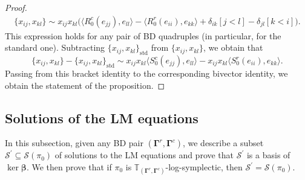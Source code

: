 \documentclass[11pt]{article}
\newcommand{\bbeta}{\boldsymbol{\beta}}
\newcommand{\bg}{\mathbf{\Gamma}}
\newcommand{\std}{\mathrm{std}}
\theoremstyle{definition}\newtheorem{definition}[theorem]{Definition}
\theoremstyle{definition}\newtheorem{remark}[theorem]{Remark}
\theoremstyle{remark}
\numberwithin{equation}{section}
\begin{document}
\begin{proof}
\begin{equation*}
        \begin{split}
            \{x_{ij},x_{kl}\} \sim x_{ij}x_{kl} \big(\langle R_0^c(e_{jj}),e_{ll}\rangle-\langle R_0^r(e_{ii}),e_{kk}\rangle  + \delta_{ik}[j<l] - \delta_{jl} [k < i]\big).
        \end{split}
    \end{equation*}
    This expression holds for any pair of BD quadruples (in particular, for the standard one). Subtracting $\{x_{ij},x_{kl}\}_{\std}$ from $\{x_{ij},x_{kl}\}$, we obtain that
    \begin{equation*}
        \{x_{ij},x_{kl}\} - \{x_{ij},x_{kl}\}_{\std} \sim x_{ij} x_{kl}\langle S_0^c(e_{jj}),e_{ll}\rangle-x_{ij} x_{kl}\langle S_0^r(e_{ii}),e_{kk}\rangle.
    \end{equation*}
    Passing from this bracket identity to the corresponding bivector identity, we obtain the statement of the proposition.
\end{proof}
\subsection{Solutions of the LM equations}\label{s:sols_lm}
In this subsection, given any BD pair $(\bg^r,\bg^c)$, we describe a subset $\mathcal{S}^\prime \subseteq \mathcal{S}(\pi_0)$ of solutions to the LM equations and prove that $\mathcal{S}^\prime$ is a basis of $\ker \bbeta$. We then prove that if $\pi_0$ is $\mathbb{T}_{(\bg^r,\bg^c)}$-log-symplectic, then $\mathcal{S}^\prime = \mathcal{S}(\pi_0)$.
\end{document}
